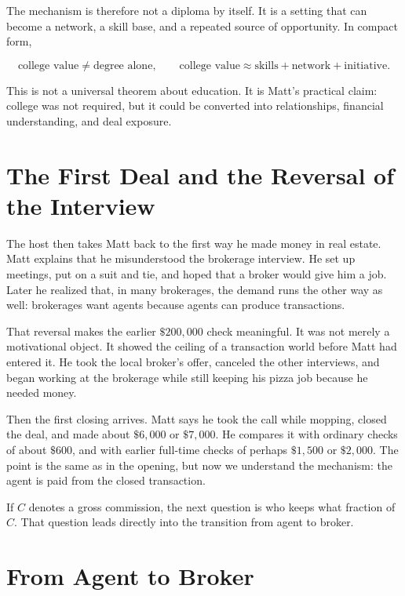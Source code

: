 The mechanism is therefore not a diploma by itself. It is a setting that can become a network, a skill base, and a repeated source of opportunity. In compact form,

\begin{equation}
\text{college value}
\neq
\text{degree alone},
\qquad
\text{college value}
\approx
\text{skills}+\text{network}+\text{initiative}.
\end{equation}

This is not a universal theorem about education. It is Matt's practical claim: college was not required, but it could be converted into relationships, financial understanding, and deal exposure.

\section{The First Deal and the Reversal of the Interview}

The host then takes Matt back to the first way he made money in real estate. Matt explains that he misunderstood the brokerage interview. He set up meetings, put on a suit and tie, and hoped that a broker would give him a job. Later he realized that, in many brokerages, the demand runs the other way as well: brokerages want agents because agents can produce transactions.

That reversal makes the earlier \(\$200{,}000\) check meaningful. It was not merely a motivational object. It showed the ceiling of a transaction world before Matt had entered it. He took the local broker's offer, canceled the other interviews, and began working at the brokerage while still keeping his pizza job because he needed money.

Then the first closing arrives. Matt says he took the call while mopping, closed the deal, and made about \(\$6{,}000\) or \(\$7{,}000\). He compares it with ordinary checks of about \(\$600\), and with earlier full-time checks of perhaps \(\$1{,}500\) or \(\$2{,}000\). The point is the same as in the opening, but now we understand the mechanism: the agent is paid from the closed transaction.

If \(C\) denotes a gross commission, the next question is who keeps what fraction of \(C\). That question leads directly into the transition from agent to broker.

\section{From Agent to Broker}

